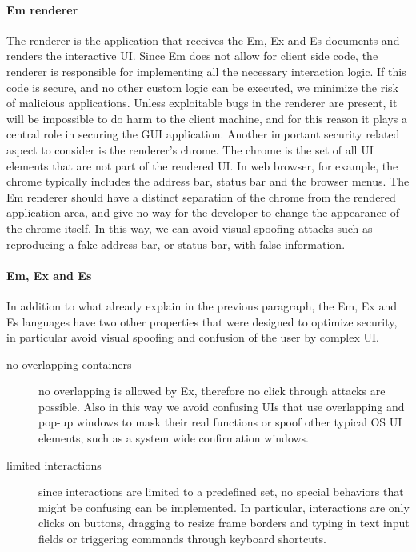 \paragraph{Em renderer}
The renderer is the application that receives the Em, Ex and Es documents and renders the interactive UI. Since Em does not allow for client side code, the renderer is responsible for implementing all the necessary interaction logic. If this code is secure, and no other custom logic can be executed, we minimize the risk of malicious applications. Unless exploitable bugs in the renderer are present, it will be impossible to do harm to the client machine, and for this reason it plays a central role in securing the GUI application.
Another important security related aspect to consider is the renderer's chrome. The chrome is the set of all UI elements that are not part of the rendered UI. In web browser, for example, the chrome typically includes the address bar, status bar and the browser menus. The Em renderer should have a distinct separation of the chrome from the rendered application area, and give no way for the developer to change the appearance of the chrome itself. In this way, we can avoid visual spoofing attacks such as reproducing a fake address bar, or status bar, with false information.

\paragraph{Em, Ex and Es}
In addition to what already explain in the previous paragraph, the Em, Ex and Es languages have two other properties that were designed to optimize security, in particular avoid visual spoofing and confusion of the user by complex UI.
\begin{description}
  \item[no overlapping containers] no overlapping is allowed by Ex, therefore no click through attacks are possible. Also in this way we avoid confusing UIs that use overlapping and pop-up windows to mask their real functions or spoof other typical OS UI elements, such as a system wide confirmation windows.
  \item[limited interactions] since interactions are limited to a predefined set, no special behaviors that might be confusing can be implemented. In particular, interactions are only clicks on buttons, dragging to resize frame borders and typing in text input fields or triggering commands through keyboard shortcuts.
\end{description}
